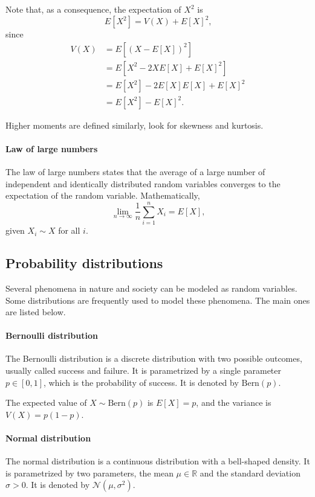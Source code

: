 Note that, as a consequence, the expectation of $X^2$ is
\[
  E[X^2] = V(X) + E[X]^2\text{,}
\]
since
\begin{align*}
  V(X)
    &= E\!\left[\left(X - E[X]\right)^2\right] \\
    &= E\!\left[X^2 - 2 X E[X] + E[X]^2\right] \\
    &= E[X^2] - 2 E[X] E[X] + E[X]^2 \\
    &= E[X^2] - E[X]^2\text{.}
\end{align*}

Higher moments are defined similarly, look for skewness and kurtosis.

\paragraph{Law of large numbers}  The law of large numbers states that the average of
a large number of independent and identically distributed random variables converges
to the expectation of the random variable.  Mathematically,
\begin{equation*}
  \lim_{n \rightarrow \infty} \frac{1}{n} \sum_{i = 1}^n X_i = E[X]\text{,}
\end{equation*}
given $X_i \sim X$ for all $i$.

\subsection{Probability distributions}

Several phenomena in nature and society can be modeled as random variables.  Some
distributions are frequently used to model these phenomena.  The main ones are
listed below.

\paragraph{Bernoulli distribution}  The Bernoulli distribution is a discrete
distribution with two possible outcomes, usually called success and failure.  It is
parametrized by a single parameter $p \in [0, 1]$, which is the probability of
success.  It is denoted by $\text{Bern}(p)$.

The expected value of $X \sim \text{Bern}(p)$ is $E[X] = p$, and the variance is
$V(X) = p(1 - p)$.

\paragraph{Normal distribution} The normal distribution is a continuous distribution
with a bell-shaped density.  It is parametrized by two parameters, the mean $\mu \in
\mathbb{R}$ and the standard deviation $\sigma > 0$.  It is denoted by
$\mathcal{N}(\mu, \sigma^2)$.

